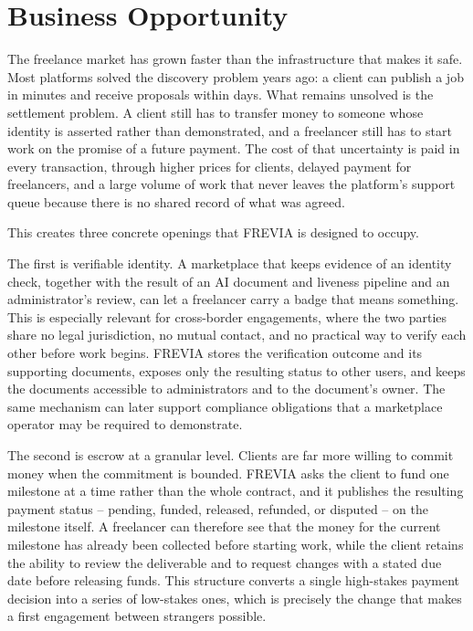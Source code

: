 \section{Business Opportunity}

The freelance market has grown faster than the infrastructure that makes it safe. Most platforms solved the discovery problem years ago: a client can publish a job in minutes and receive proposals within days. What remains unsolved is the settlement problem. A client still has to transfer money to someone whose identity is asserted rather than demonstrated, and a freelancer still has to start work on the promise of a future payment. The cost of that uncertainty is paid in every transaction, through higher prices for clients, delayed payment for freelancers, and a large volume of work that never leaves the platform's support queue because there is no shared record of what was agreed.

This creates three concrete openings that FREVIA is designed to occupy.

The first is verifiable identity. A marketplace that keeps evidence of an identity check, together with the result of an AI document and liveness pipeline and an administrator's review, can let a freelancer carry a badge that means something. This is especially relevant for cross-border engagements, where the two parties share no legal jurisdiction, no mutual contact, and no practical way to verify each other before work begins. FREVIA stores the verification outcome and its supporting documents, exposes only the resulting status to other users, and keeps the documents accessible to administrators and to the document's owner. The same mechanism can later support compliance obligations that a marketplace operator may be required to demonstrate.

The second is escrow at a granular level. Clients are far more willing to commit money when the commitment is bounded. FREVIA asks the client to fund one milestone at a time rather than the whole contract, and it publishes the resulting payment status -- pending, funded, released, refunded, or disputed -- on the milestone itself. A freelancer can therefore see that the money for the current milestone has already been collected before starting work, while the client retains the ability to review the deliverable and to request changes with a stated due date before releasing funds. This structure converts a single high-stakes payment decision into a series of low-stakes ones, which is precisely the change that makes a first engagement between strangers possible.

